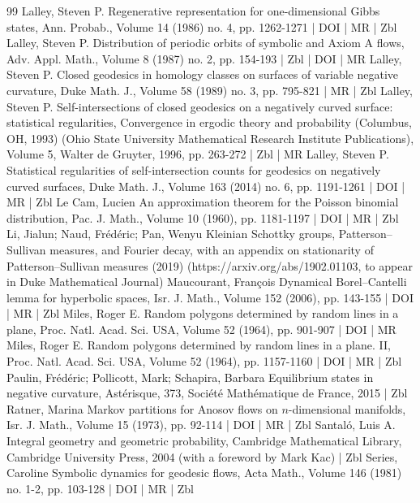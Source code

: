 \documentclass[10pt]{amsart}
\theoremstyle{definition}\newtheorem{defi}[theo]{Definition}\newtheorem{rema}[theo]{Remark}\newtheorem{exam}[theo]{Example}\newtheorem{exem}[theo]{Example}\newtheorem{nota}[theo]{Notation}
\begin{document}
\begin{thebibliography}{99}
Lalley, Steven P. Regenerative representation for one-dimensional Gibbs states, Ann. Probab., Volume 14 (1986) no. 4, pp. 1262-1271 | DOI | MR | Zbl
Lalley, Steven P. Distribution of periodic orbits of symbolic and Axiom A flows, Adv. Appl. Math., Volume 8 (1987) no. 2, pp. 154-193 | Zbl | DOI | MR
Lalley, Steven P. Closed geodesics in homology classes on surfaces of variable negative curvature, Duke Math. J., Volume 58 (1989) no. 3, pp. 795-821 | MR | Zbl
Lalley, Steven P. Self-intersections of closed geodesics on a negatively curved surface: statistical regularities, Convergence in ergodic theory and probability (Columbus, OH, 1993) (Ohio State University Mathematical Research Institute Publications), Volume 5, Walter de Gruyter, 1996, pp. 263-272 | Zbl | MR
Lalley, Steven P. Statistical regularities of self-intersection counts for geodesics on negatively curved surfaces, Duke Math. J., Volume 163 (2014) no. 6, pp. 1191-1261 | DOI | MR | Zbl
Le Cam, Lucien An approximation theorem for the Poisson binomial distribution, Pac. J. Math., Volume 10 (1960), pp. 1181-1197 | DOI | MR | Zbl
Li, Jialun; Naud, Frédéric; Pan, Wenyu Kleinian Schottky groups, Patterson–Sullivan measures, and Fourier decay, with an appendix on stationarity of Patterson–Sullivan measures (2019) (https://arxiv.org/abs/1902.01103, to appear in Duke Mathematical Journal)
Maucourant, François Dynamical Borel–Cantelli lemma for hyperbolic spaces, Isr. J. Math., Volume 152 (2006), pp. 143-155 | DOI | MR | Zbl
Miles, Roger E. Random polygons determined by random lines in a plane, Proc. Natl. Acad. Sci. USA, Volume 52 (1964), pp. 901-907 | DOI | MR
Miles, Roger E. Random polygons determined by random lines in a plane. II, Proc. Natl. Acad. Sci. USA, Volume 52 (1964), pp. 1157-1160 | DOI | MR | Zbl
Paulin, Frédéric; Pollicott, Mark; Schapira, Barbara Equilibrium states in negative curvature, Astérisque, 373, Société Mathématique de France, 2015 | Zbl
Ratner, Marina Markov partitions for Anosov flows on $n$-dimensional manifolds, Isr. J. Math., Volume 15 (1973), pp. 92-114 | DOI | MR | Zbl
Santaló, Luis A. Integral geometry and geometric probability, Cambridge Mathematical Library, Cambridge University Press, 2004 (with a foreword by Mark Kac) | Zbl
Series, Caroline Symbolic dynamics for geodesic flows, Acta Math., Volume 146 (1981) no. 1-2, pp. 103-128 | DOI | MR | Zbl

\end{thebibliography}
\end{document}
